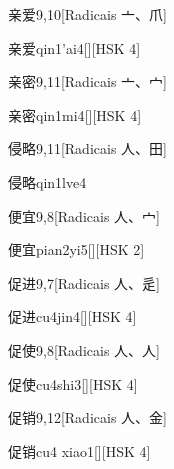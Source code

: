 \begin{entry}{亲爱}{9,10}[Radicais ⼇、⽖]
  \begin{phonetics}{亲爱}{qin1'ai4}[][HSK 4]
  \end{phonetics}
\end{entry}

\begin{entry}{亲密}{9,11}[Radicais ⼇、⼧]
  \begin{phonetics}{亲密}{qin1mi4}[][HSK 4]
  \end{phonetics}
\end{entry}

\begin{entry}{侵略}{9,11}[Radicais ⼈、⽥]
  \begin{phonetics}{侵略}{qin1lve4}
  \end{phonetics}
\end{entry}

\begin{entry}{便宜}{9,8}[Radicais ⼈、⼧]
  \begin{phonetics}{便宜}{pian2yi5}[][HSK 2]
  \end{phonetics}
\end{entry}

\begin{entry}{促进}{9,7}[Radicais ⼈、⾡]
  \begin{phonetics}{促进}{cu4jin4}[][HSK 4]
  \end{phonetics}
\end{entry}

\begin{entry}{促使}{9,8}[Radicais ⼈、⼈]
  \begin{phonetics}{促使}{cu4shi3}[][HSK 4]
  \end{phonetics}
\end{entry}

\begin{entry}{促销}{9,12}[Radicais ⼈、⾦]
  \begin{phonetics}{促销}{cu4 xiao1}[][HSK 4]
  \end{phonetics}
\end{entry}

